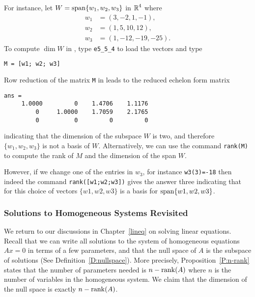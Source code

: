 \documentclass{ximera}
\begin{document}
For instance, let $W={\rm span}\{w_1,w_2,w_3\}$ in $\mbox{$\Bbb{R}$}^4$ where
\begin{align*} \label{eq:vectors}
  w_1 &= (3, -2, 1,-1), \\
  w_2 &= (1,5,10,12), \\
  w_3 &= (1,-12,-19,-25).
\end{align*}%
To compute $\dim W$ in \Matlab, type \verb+e5_5_4+ to load the
vectors and type
\begin{verbatim}
M = [w1; w2; w3]
\end{verbatim}
Row reduction of the matrix {\tt M} in \Matlab
leads to the reduced echelon form matrix
\begin{verbatim}
ans =
     1.0000         0    1.4706    1.1176
         0     1.0000    1.7059    2.1765
         0          0         0         0
\end{verbatim}
indicating that the dimension of the subspace $W$ is two, and
therefore $\{w_1,w_2,w_3\}$ is not a basis of $W$. Alternatively,
we can use the \Matlab command {\tt rank(M)}
to compute the rank of $M$ and the dimension of the span $W$.

However, if we change one of the entries in $w_3$, for instance
{\tt w3(3)=-18} then indeed the command {\tt rank([w1;w2;w3])}
gives the answer three indicating that for this choice of vectors
$\{w1,w2,w3\}$ is a basis for ${\rm span}\{w1,w2,w3\}$.

\subsubsection*{Solutions to Homogeneous Systems Revisited}

We return to our discussions in Chapter~\ref{lineq} on solving
linear equations.  Recall that we can write all solutions to
the system of homogeneous equations $Ax=0$ in terms of a few
parameters, and that the null space of $A$ is the subspace of
solutions (See Definition~\ref{D:nullspace}).
More precisely, Proposition~\ref{P:n-rank} states that the number of
parameters needed is $n-{\rm rank}(A)$ where $n$ is the number of
variables in the homogeneous system.  We claim that the dimension
of the null space is exactly
$n - {\rm rank}(A)$.
\end{document}
